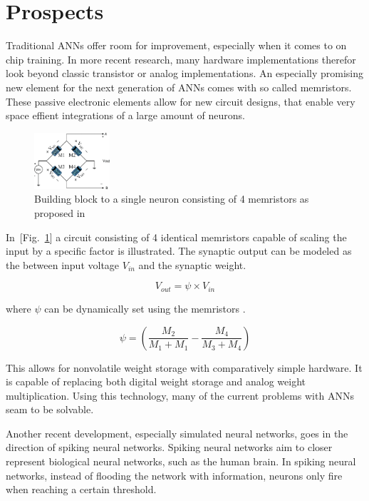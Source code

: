 \documentclass[conference]{IEEEtran}
\begin{document}
    \section{Prospects}

    Traditional ANNs offer room for improvement, especially when it comes to on chip training.
    In more recent research, many hardware implementations therefor look beyond classic transistor or analog implementations.
    An especially promising new element for the next generation of ANNs comes with so called memristors.
    These passive electronic elements allow for new circuit designs, that enable very space effient integrations of a large amount of neurons.

    \begin{figure}[h]
        \centering
        \includegraphics[width=0.25\textwidth]{resources/memristor.png}
        \caption{Building block to a single neuron consisting of 4 memristors as proposed in \cite[Fig.~1]{adhikari2012memristor}}
        \label{fig:memristor}
    \end{figure}

    In~[Fig.~\ref{fig:memristor}] a circuit consisting of 4 identical memristors capable of scaling the input by a specific factor is illustrated.
    The synaptic output can be modeled as the between input voltage $V_{in}$ and the synaptic weight.

    \[V_{out} = \psi \times V_{in}\]

    where $\psi$ can be dynamically set using the memristors \cite{adhikari2012memristor}.

    \[\psi = \left(\frac{M_2}{M_1+M_1} - \frac{M_4}{M_3+M_4}\right)\]

    This allows for nonvolatile weight storage with comparatively simple hardware.
    It is capable of replacing both digital weight storage and analog weight multiplication.
    Using this technology, many of the current problems with ANNs seam to be solvable.

    Another recent development, especially simulated neural networks, goes in the direction of spiking neural networks.
    Spiking neural networks aim to closer represent biological neural networks, such as the human brain.
    In spiking neural networks, instead of flooding the network with information, neurons only fire when reaching a certain threshold.
\end{document}
